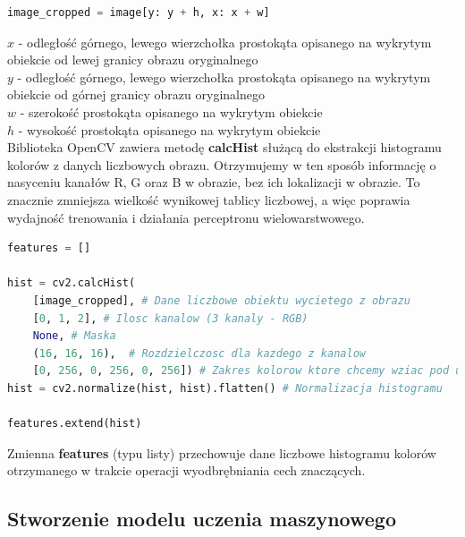 \begin{lstlisting}[language=Python, caption=Wycięcie obiektów]
image_cropped = image[y: y + h, x: x + w]
\end{lstlisting}
\begin{math}
x
\end{math}
- odległość górnego, lewego wierzchołka prostokąta opisanego na wykrytym obiekcie od lewej granicy obrazu oryginalnego\\
\begin{math}
y
\end{math}
- odległość górnego, lewego wierzchołka prostokąta opisanego na wykrytym obiekcie od górnej granicy obrazu oryginalnego\\
\begin{math}
w
\end{math}
- szerokość prostokąta opisanego na wykrytym obiekcie\\
\begin{math}
h
\end{math}
- wysokość prostokąta opisanego na wykrytym obiekcie\\

Biblioteka OpenCV zawiera metodę \textbf{calcHist} służącą do ekstrakcji histogramu kolorów z danych liczbowych obrazu. Otrzymujemy w ten sposób informację o nasyceniu kanałów R, G oraz B w obrazie, bez ich lokalizacji w obrazie. To znacznie zmniejsza wielkość wynikowej tablicy liczbowej, a więc poprawia wydajność trenowania i działania perceptronu wielowarstwowego.

\begin{lstlisting}[language=Python, caption=Wyodrębnienie cech znaczących]
 features = []

hist = cv2.calcHist(
    [image_cropped], # Dane liczbowe obiektu wycietego z obrazu
    [0, 1, 2], # Ilosc kanalow (3 kanaly - RGB)
    None, # Maska
    (16, 16, 16),  # Rozdzielczosc dla kazdego z kanalow
    [0, 256, 0, 256, 0, 256]) # Zakres kolorow ktore chcemy wziac pod uwage dla kazdego z kanalow
hist = cv2.normalize(hist, hist).flatten() # Normalizacja histogramu

features.extend(hist)
\end{lstlisting}

Zmienna \textbf{features} (typu listy) przechowuje dane liczbowe histogramu kolorów otrzymanego w trakcie operacji wyodbrębniania cech znaczących.

\subsection{Stworzenie modelu uczenia maszynowego}

